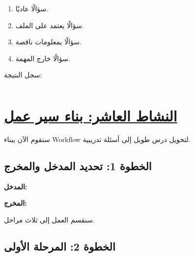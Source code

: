 \documentclass[a4paper]{article}
\begin{document}
\begin{enumerate}

    \item سؤالًا عاديًا.

    \item سؤالًا يعتمد على الملف.

    \item سؤالًا بمعلومات ناقصة.

    \item سؤالًا خارج المهمة.

\end{enumerate}

سجل النتيجة:

\[
\boxed{\hspace{15cm}}
\]



\section*{\khatt\underline{النشاط العاشر: بناء سير عمل}}

سنقوم الآن ببناء \textenglish{Workflow}
لتحويل درس طويل إلى أسئلة تدريبية.



\subsection*{\khatt الخطوة 1: تحديد المدخل والمخرج}

\textbf{المدخل:}

\begin{center}


\end{center}

\textbf{المخرج:}

\begin{center}


\end{center}

سنقسم العمل إلى ثلاث مراحل.



\subsection*{\khatt الخطوة 2: المرحلة الأولى}
\end{document}
